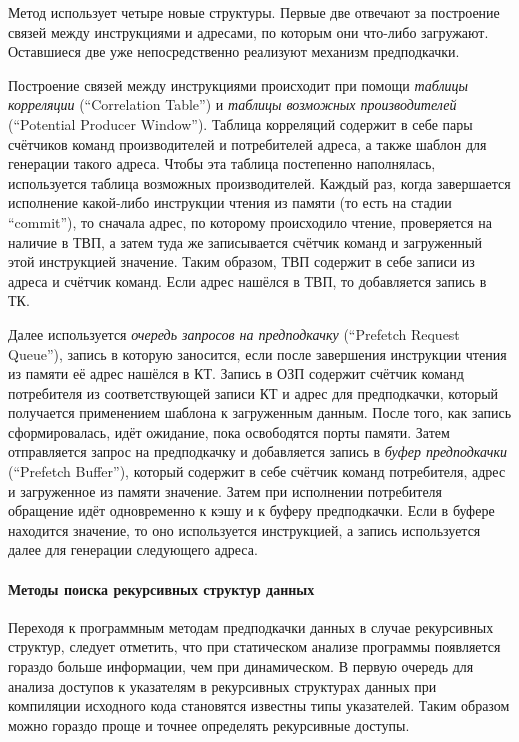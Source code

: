 \documentclass[12pt,a4paper,oneside]{article}
\begin{document}
Метод использует четыре новые структуры. Первые две отвечают за построение связей между инструкциями и адресами, по которым они что-либо загружают. Оставшиеся две уже непосредственно реализуют механизм предподкачки.

Построение связей между инструкциями происходит при помощи \emph{таблицы корреляции} (``Correlation Table'') и \emph{таблицы возможных производителей} (``Potential Producer Window''). Таблица корреляций содержит в себе пары счётчиков команд производителей и потребителей адреса, а также шаблон для генерации такого адреса. Чтобы эта таблица постепенно наполнялась, используется таблица возможных производителей. Каждый раз, когда завершается исполнение какой-либо инструкции чтения из памяти (то есть на стадии ``commit''), то сначала адрес, по которому происходило чтение, проверяется на наличие в ТВП, а затем туда же записывается счётчик команд и загруженный этой инструкцией значение. Таким образом, ТВП содержит в себе записи из адреса и счётчик команд. Если адрес нашёлся в ТВП, то добавляется запись в ТК.

Далее используется \emph{очередь запросов на предподкачку} (``Prefetch Request Queue''), запись в которую заносится, если после завершения инструкции чтения из памяти её адрес нашёлся в КТ. Запись в ОЗП содержит счётчик команд потребителя из соответствующей записи КТ и адрес для предподкачки, который получается применением шаблона к загруженным данным. После того, как запись сформировалась, идёт ожидание, пока освободятся порты памяти. Затем отправляется запрос на предподкачку и добавляется запись в \emph{буфер предподкачки} (``Prefetch Buffer''), который содержит в себе счётчик команд потребителя, адрес и загруженное из памяти значение. Затем при исполнении потребителя обращение идёт одновременно к кэшу и к буферу предподкачки. Если в буфере находится значение, то оно используется инструкцией, а запись используется далее для генерации следующего адреса.

\paragraph{Методы поиска рекурсивных структур данных}

Переходя к программным методам предподкачки данных в случае рекурсивных структур, следует отметить, что при статическом анализе программы появляется гораздо больше информации, чем при динамическом. В первую очередь для анализа доступов к указателям в рекурсивных структурах данных при компиляции исходного кода становятся известны типы указателей. Таким образом можно гораздо проще и точнее определять рекурсивные доступы.
\end{document}
